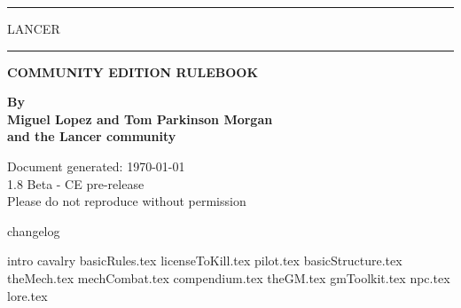 \documentclass[11pt, letterpaper, openany]{memoir}
\makeatletter
\renewcommand\mainmatter{%
     \clearpage
   \@mainmattertrue
   \pagenumbering{arabic}}
\makeatother
\begin{document}
\begin{center}
\rule[1cm]{0.78\textwidth}{3mm}
{\fontsize{96}{115}\selectfont LANCER}
\rule[-1cm]{0.78\textwidth}{3mm}

\vspace{2cm}
\huge\textbf{COMMUNITY EDITION RULEBOOK}

\vspace{4cm}
\normalsize\textbf{By} \\
\textbf{Miguel Lopez and Tom Parkinson Morgan}\\
\textbf{and the Lancer community}\\

\vspace{2cm}
\date{} %
Document generated: \today \\

\vspace{1cm}
1.8 Beta - CE pre-release\\
Please do not reproduce without permission
\clearpage
\end{center}

{changelog}
\clearpage

\tableofcontents
\endgroup %
\mainmatter
\pagestyle{plain}
\addtocounter{page}{12}

{intro}
{cavalry}
{basicRules.tex}
{licenseToKill.tex}
{pilot.tex}
{basicStructure.tex}
{theMech.tex}
{mechCombat.tex}
{compendium.tex}
{theGM.tex}
{gmToolkit.tex}
{npc.tex}
{lore.tex}
\end{document}
